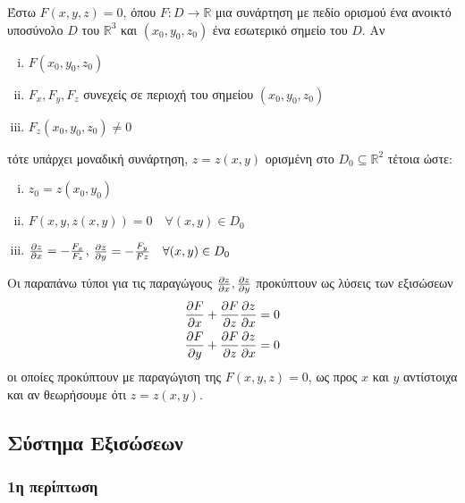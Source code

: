 Έστω $ F(x,y,z) = 0 $, όπου $F\colon D \to \mathbb{R}$ μια συνάρτηση με πεδίο ορισμού 
ένα ανοικτό υποσύνολο $ D $ του $ \mathbb{R}^{3}  $ και $ (x_0,y_0,z_0) $ ένα 
εσωτερικό σημείο του $ D $. Αν
\begin{enumerate}[(i)]
    \item $ F(x_0,y_0,z_0) $
    \item $ F_x, F_y, F_z $ συνεχείς σε περιοχή του σημείου $ (x_0,y_0,z_0) $
    \item $ F_z(x_0,y_0,z_0) \neq 0 $
\end{enumerate}
τότε υπάρχει μοναδική συνάρτηση, $ z=z(x,y) $ ορισμένη στο 
$ D_0 \subseteq \mathbb{R}^{2} $ τέτοια ώστε:
\begin{enumerate}[(i)]
    \item $ z_0 = z(x_0,y_0) $
    \item $ F(x,y,z(x,y)) = 0  \quad \forall (x,y)\in  D_0 $
    \item $ \pdv{z}{x} = - \frac{F_x}{F_z} $, $ \pdv{z}{y} = - \frac{F_y}{Fz}\quad 
        \forall (x,y) \in D_0$
\end{enumerate}

\begin{rem}
    Οι παραπάνω τύποι για τις παραγώγους $ \pdv{z}{x}, \pdv{z}{y} $ προκύπτουν 
    ως λύσεις των εξισώσεων  
    \begin{align*}	
    \pdv{F}{x} + \pdv{F}{z}\pdv{z}{x} &= 0 \\
    \pdv{F}{y} + \pdv{F}{z}\pdv{z}{x} &= 0 
\end{align*}
οι οποίες προκύπτουν με παραγώγιση της $ F(x,y,z) = 0 $, ως προς $x$ και $y$ 
αντίστοιχα και  αν θεωρήσουμε ότι $ z=z(x,y) $.

\end{rem}

\subsection{Σύστημα Εξισώσεων}

\subsubsection{1η περίπτωση}

